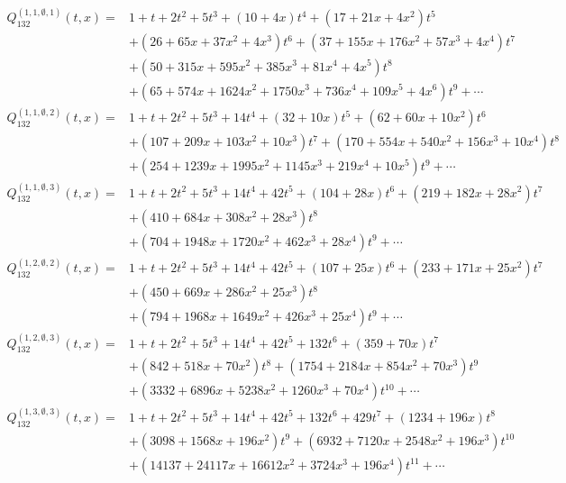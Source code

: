 \documentclass[
final,nomarks
]{dmtcs-episciences}
\newcommand{\Qmm}[1]{Q_{132}^{(#1)}(t,x)}
\begin{document}
\begin{align}
\Qmm{1,1,\emptyset,1}=&1+t+2 t^2+5 t^3+(10+4 x) t^4+\left(17+21 x+4 x^2\right) t^5\nonumber\\\nonumber
&+\left(26+65 x+37
x^2+4 x^3\right) t^6+\left(37+155 x+176 x^2+57 x^3+4 x^4\right)
t^7\\\nonumber
&+\left(50+315 x+595 x^2+385 x^3+81 x^4+4 x^5\right) t^8\\
&+\left(65+574
x+1624 x^2+1750 x^3+736 x^4+109 x^5+4 x^6\right) t^9+\cdots
\\
\Qmm{1,1,\emptyset,2}=&1+t+2 t^2+5 t^3+14 t^4+(32+10 x) t^5+\left(62+60 x+10 x^2\right)
t^6\nonumber\\\nonumber
&+\left(107+209 x+103 x^2+10 x^3\right) t^7+\left(170+554 x+540 x^2+156
x^3+10 x^4\right) t^8\\
&+\left(254+1239 x+1995 x^2+1145 x^3+219 x^4+10
x^5\right) t^9+\cdots
\\
\Qmm{1,1,\emptyset,3}=&1+t+2 t^2+5 t^3+14 t^4+42 t^5+(104+28 x) t^6+\left(219+182 x+28 x^2\right)
t^7\nonumber\\\nonumber
&+\left(410+684 x+308 x^2+28 x^3\right) t^8\\
&+\left(704+1948 x+1720 x^2+462
x^3+28 x^4\right) t^9+\cdots
\\
\Qmm{1,2,\emptyset,2}=&1+t+2 t^2+5 t^3+14 t^4+42 t^5+(107+25 x) t^6+\left(233+171 x+25 x^2\right)
t^7\nonumber\\\nonumber
&+\left(450+669 x+286 x^2+25 x^3\right) t^8\\
&+\left(794+1968 x+1649 x^2+426
x^3+25 x^4\right) t^9+\cdots
\\
\Qmm{1,2,\emptyset,3}=&1+t+2 t^2+5 t^3+14 t^4+42 t^5+132 t^6+(359+70 x) t^7\nonumber\\\nonumber
&+\left(842+518 x+70
x^2\right) t^8+\left(1754+2184 x+854 x^2+70 x^3\right) t^9\\
&+\left(3332+6896
x+5238 x^2+1260 x^3+70 x^4\right) t^{10}+\cdots
\\
\Qmm{1,3,\emptyset,3}=&1+t+2 t^2+5 t^3+14 t^4+42 t^5+132 t^6+429 t^7+(1234+196 x) t^8\nonumber\\\nonumber
&+\left(3098+1568
x+196 x^2\right) t^9+\left(6932+7120 x+2548 x^2+196 x^3\right)
t^{10}\\
&+\left(14137+24117 x+16612 x^2+3724 x^3+196 x^4\right)
t^{11}+\cdots
\end{align}
\end{document}
